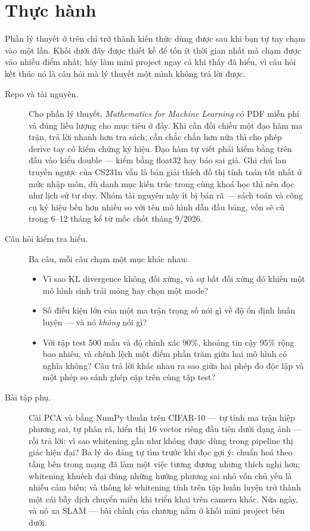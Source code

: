 \documentclass[../../deep_learning.tex]{subfiles}
\begin{document}






\section{Thực hành}
Phần lý thuyết ở trên chỉ trở thành kiến thức dùng được sau khi bạn tự tay chạm vào một lần. Khối dưới đây được thiết kế để tốn ít thời gian nhất mà chạm được vào nhiều điểm nhất; hãy làm mini project ngay cả khi thấy đã hiểu, vì câu hỏi kết thúc nó là câu hỏi mà lý thuyết một mình không trả lời được.

\begin{description}
\item[Repo và tài nguyên.] Cho phần lý thuyết, \emph{Mathematics for Machine Learning} \cite{deisenroth2020} có PDF miễn phí và đúng liều lượng cho mục tiêu ở đây. Khi cần đối chiếu một đạo hàm ma trận,  trả lời nhanh hơn tra sách; cần chắc chắn hơn nữa thì  cho phép derive tay có kiểm chứng ký hiệu. Đạo hàm tự viết phải kiểm bằng  trên đầu vào kiểu double --- kiểm bằng float32 hay báo sai giả. Ghi chú lan truyền ngược của CS231n vẫn là bản giải thích đồ thị tính toán tốt nhất ở mức nhập môn, dù danh mục kiến trúc trong cùng khoá học thì nên đọc như lịch sử tư duy. Nhóm tài nguyên này ít bị bán rã --- sách toán và công cụ ký hiệu bền hơn nhiều so với tên mô hình dẫn đầu bảng, vốn sẽ cũ trong 6--12 tháng kể từ mốc chốt tháng 9/2026.
\item[Câu hỏi kiểm tra hiểu.] Ba câu, mỗi câu chạm một mục khác nhau:
  \begin{itemize}
  \item Vì sao KL divergence không đối xứng, và sự bất đối xứng đó khiến một mô hình sinh trải mỏng hay chọn một mode?
  \item Số điều kiện lớn của một ma trận trọng số nói gì về độ ổn định huấn luyện --- và nó \emph{không} nói gì?
  \item Với tập test 500 mẫu và độ chính xác \(90\%\), khoảng tin cậy \(95\%\) rộng bao nhiêu, và chênh lệch một điểm phần trăm giữa hai mô hình có nghĩa không? Câu trả lời khác nhau ra sao giữa hai phép đo độc lập và một phép so sánh ghép cặp trên cùng tập test?
  \end{itemize}
\item[Bài tập phụ.] Cài PCA và  bằng NumPy thuần trên CIFAR-10 --- tự tính ma trận hiệp phương sai, tự phân rã, hiển thị 16 vector riêng đầu tiên dưới dạng ảnh --- rồi trả lời: vì sao whitening gần như không được dùng trong pipeline thị giác hiện đại? Ba lý do đáng tự tìm trước khi đọc gợi ý: chuẩn hoá theo tầng bên trong mạng đã làm một việc tương đương nhưng thích nghi hơn; whitening khuếch đại đúng những hướng phương sai nhỏ vốn chủ yếu là nhiễu cảm biến; và thống kê whitening tính trên tập huấn luyện trở thành một cái bẫy dịch chuyển miền khi triển khai trên camera khác. Nửa ngày, và nó xa SLAM --- bài chính của chương nằm ở khối mini project bên dưới.
\end{description}
\end{document}
